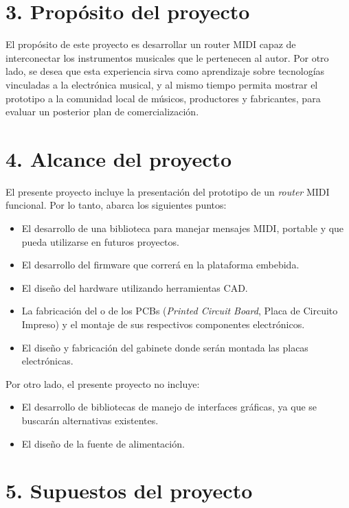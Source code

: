 \documentclass[
11pt, %
]{charter}
\begin{document}
\section{3. Propósito del proyecto}
\label{sec:proposito}

El propósito de este proyecto es desarrollar un router MIDI capaz de interconectar los instrumentos musicales que le pertenecen al autor. Por otro lado, se desea que esta experiencia sirva como aprendizaje sobre tecnologías vinculadas a la electrónica musical, y al mismo tiempo permita mostrar el prototipo a la comunidad local de músicos, productores y fabricantes, para evaluar un posterior plan de comercialización.

\section{4. Alcance del proyecto}
\label{sec:alcance}

El presente proyecto incluye la presentación del prototipo de un \emph{router} MIDI funcional. Por lo tanto, abarca los siguientes puntos:

\begin{itemize}
	\item El desarrollo de una biblioteca para manejar mensajes MIDI, portable y que pueda utilizarse en futuros proyectos.
	\item El desarrollo del firmware que correrá en la plataforma embebida.
	\item El diseño del hardware utilizando herramientas CAD.
	\item La fabricación del o de los PCBs (\emph{Printed Circuit Board}, Placa de Circuito Impreso) y el montaje de sus respectivos componentes electrónicos.
	\item El diseño y fabricación del gabinete donde serán montada las placas electrónicas.
\end{itemize}

Por otro lado, el presente proyecto no incluye:
\begin{itemize}
	\item El desarrollo de bibliotecas de manejo de interfaces gráficas, ya que se buscarán alternativas existentes.
	\item El diseño de la fuente de alimentación.
\end{itemize}

\section{5. Supuestos del proyecto}
\label{sec:supuestos}
\end{document}
